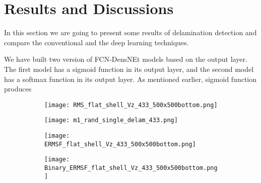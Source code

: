 \section{Results and Discussions}
	In this section we are going to present some results of delamination detection and compare the conventional and the deep learning techniques.
	

	We have built two version of FCN-DensNEt models based on the output layer.
	The first model has a sigmoid function in its output layer, and the second model has a softmax function in its output layer.
	As mentioned earlier, sigmoid function produces  
	
	
	\begin{figure} [h!]
		\centering
		\begin{subfigure}[b]{0.47\textwidth}
			\centering
			\texttt{[image: RMS\_flat\_shell\_Vz\_433\_500x500bottom.png]}
			\caption{}
			\label{fig:dispersion0deg_direct}
		\end{subfigure}
		\hfill
		\begin{subfigure}[b]{0.47\textwidth}
			\centering
			\texttt{[image: m1\_rand\_single\_delam\_433.png]}
			\caption{}
			\label{fig:m1_rand_single_delam_433}
		\end{subfigure}
		\hfill
		\begin{subfigure}[b]{0.47\textwidth}
			\centering
			\texttt{[image: ERMSF\_flat\_shell\_Vz\_433\_500x500bottom.png]}
			\caption{}
			\label{fig:ERMSF_flat_shell_Vz_433}
		\end{subfigure}
		\hfill
		\begin{subfigure}[b]{0.47\textwidth}
			\centering
			\texttt{[image: Binary\_ERMSF\_flat\_shell\_Vz\_433\_500x500bottom.png]}
			\caption{}
			\label{fig:dispersion45deg_direct}
		\end{subfigure}

		
		\caption{}
		\label{fig:optimized_direct}
	\end{figure} 
